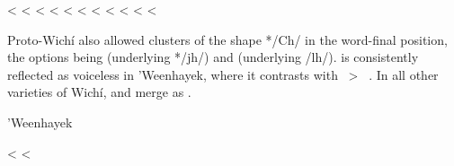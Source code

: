     \begin{xlist}
        \ex {} <  \label{cx-mlp-boys}
        \ex {} <  \label{cx-mlp-gorges}
        \ex {} < 
        \ex {} < 
        \ex {} < 
        \ex {} < 
        \ex {} < 
        \ex {} < 
        \ex {} <  \label{cx-mlp-forest}
        \ex {} <  \label{cx-mlp-pots}
        \ex {} <  \label{cx-mlp-holes}
    \end{xlist}
\z
{}

Proto-Wichí also allowed clusters of the shape */Ch/ in the word-final position, the options being  (underlying */jh/) and  (underlying /lh/).  is consistently reflected as voiceless  in ’Weenhayek, where it contrasts with ~>~ . In all other varieties of Wichí,  and  merge as .

\ea
’Weenhayek \citep{KC16} \label{wi-whk-yhy}\\
    \begin{xlist}
        \ex {} < 
        \ex {} < 
    \end{xlist}
\z
{}

